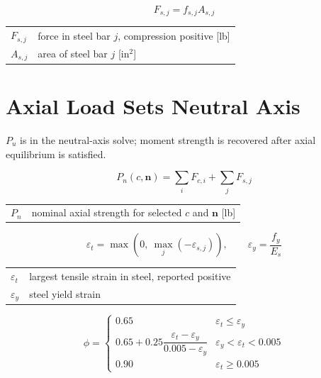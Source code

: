 \documentclass[10pt]{article}
\begin{document}
\begin{equation}
F_{s,j} = f_{s,j} A_{s,j}
\end{equation}

{\ttfamily\footnotesize
\begin{tabular}{@{}ll@{}}
$F_{s,j}$ & force in steel bar $j$, compression positive [lb] \\
$A_{s,j}$ & area of steel bar $j$ [in$^2$] \\
\end{tabular}
}

\section{Axial Load Sets Neutral Axis}

$P_u$ is in the neutral-axis solve; moment strength is recovered after axial equilibrium is satisfied.

\begin{equation}
P_n(c,\mathbf n) = \sum_i F_{c,i}+\sum_j F_{s,j}
\end{equation}

{\ttfamily\footnotesize
\begin{tabular}{@{}ll@{}}
$P_n$ & nominal axial strength for selected $c$ and $\mathbf n$ [lb] \\
\end{tabular}
}

\begin{equation}
\varepsilon_t = \max\!\left(0,\ \max_j(-\varepsilon_{s,j})\right), \qquad
\varepsilon_y = \frac{f_y}{E_s}
\end{equation}

{\ttfamily\footnotesize
\begin{tabular}{@{}ll@{}}
$\varepsilon_t$ & largest tensile strain in steel, reported positive \\
$\varepsilon_y$ & steel yield strain \\
\end{tabular}
}

\begin{equation}
\phi =
\begin{cases}
0.65 & \varepsilon_t \leq \varepsilon_y \\
0.65 + 0.25\dfrac{\varepsilon_t-\varepsilon_y}{0.005-\varepsilon_y} &
\varepsilon_y < \varepsilon_t < 0.005 \\
0.90 & \varepsilon_t \geq 0.005
\end{cases}
\end{equation}
\end{document}
